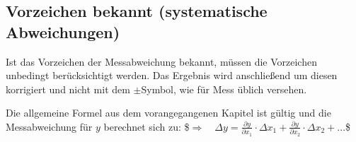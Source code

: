 \documentclass[letterpaper,10pt,english]{jupyterBook}
\begin{document}
\subsection{Vorzeichen bekannt (systematische Abweichungen)}
\label{\detokenize{content/1_Fehlerfortpflanzung:vorzeichen-bekannt-systematische-abweichungen}}
\sphinxAtStartPar
Ist das Vorzeichen der Messabweichung bekannt, müssen die Vorzeichen unbedingt berücksichtigt werden. Das Ergebnis wird anschließend um diesen  korrigiert und nicht mit dem \(\pm\)\sphinxhyphen{}Symbol, wie für Mess üblich versehen.

\sphinxAtStartPar
Die allgemeine Formel aus dem vorangegangenen Kapitel ist gültig und die Messabweichung für \(y\) berechnet sich zu:
\$\(\Rightarrow \quad \Delta y = \frac{\partial y}{\partial x_1} \cdot \Delta x_1 + \frac{\partial y}{\partial x_2} \cdot \Delta x_2 + ...\)\$
\end{document}

